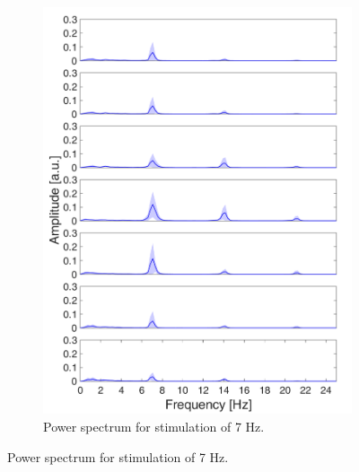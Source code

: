 \documentclass{pracalicmgr}
\begin{document}
\begin{figure}[H]
\begin{subfigure}{.5\textwidth}
		\includegraphics[width=1.\linewidth]{widmo_7Hz.png}
		\caption{Power spectrum for stimulation of 7 Hz.}
		\label{rys:widmo_7Hz}
	\end{subfigure}
		

\end{figure}
\end{document}
